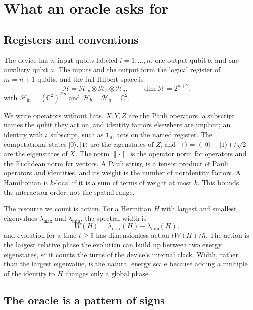 \documentclass[11pt,a4paper]{article}
\providecommand{\openone}{\mathbf{1}}
\newcommand{\ket}[1]{\lvert #1\rangle}
\newcommand{\norm}[1]{\lVert #1\rVert}
\newcommand{\id}{\openone}
\begin{document}
\section{What an oracle asks for}
\label{sec:task}

\subsection{Registers and conventions}

The device has $n$ input qubits labeled $i=1,\ldots,n$, one output qubit $b$, and one auxiliary qubit $a$. The inputs and the output form the logical register of $m=n+1$ qubits, and the full Hilbert space is
\begin{equation}
 \mathcal H=\mathcal H_{\mathrm{in}}\otimes\mathcal H_b\otimes\mathcal H_a,
 \qquad \dim\mathcal H=2^{n+2},
\end{equation}
with $\mathcal H_{\mathrm{in}}=(\mathbb C^2)^{\otimes n}$ and $\mathcal H_b=\mathcal H_a=\mathbb C^2$.

We write operators without hats. $X,Y,Z$ are the Pauli operators, a subscript names the qubit they act on, and identity factors elsewhere are implicit; an identity with a subscript, such as $\id_a$, acts on the named register. The computational states $\ket0,\ket1$ are the eigenstates of $Z$, and $\ket\pm=(\ket0\pm\ket1)/\sqrt2$ are the eigenstates of $X$. The norm $\norm{\cdot}$ is the operator norm for operators and the Euclidean norm for vectors. A Pauli string is a tensor product of Pauli operators and identities, and its weight is the number of nonidentity factors. A Hamiltonian is $k$-local if it is a sum of terms of weight at most $k$. This bounds the interaction order, not the spatial range.

The resource we count is action. For a Hermitian $H$ with largest and smallest eigenvalues $\lambda_{\max}$ and $\lambda_{\min}$, the spectral width is
\begin{equation}
 W(H)=\lambda_{\max}(H)-\lambda_{\min}(H),
\end{equation}
and evolution for a time $t\ge0$ has dimensionless action $tW(H)/\hbar$. The action is the largest relative phase the evolution can build up between two energy eigenstates, so it counts the turns of the device's internal clock. Width, rather than the largest eigenvalue, is the natural energy scale because adding a multiple of the identity to $H$ changes only a global phase.

\subsection{The oracle is a pattern of signs}
\end{document}

